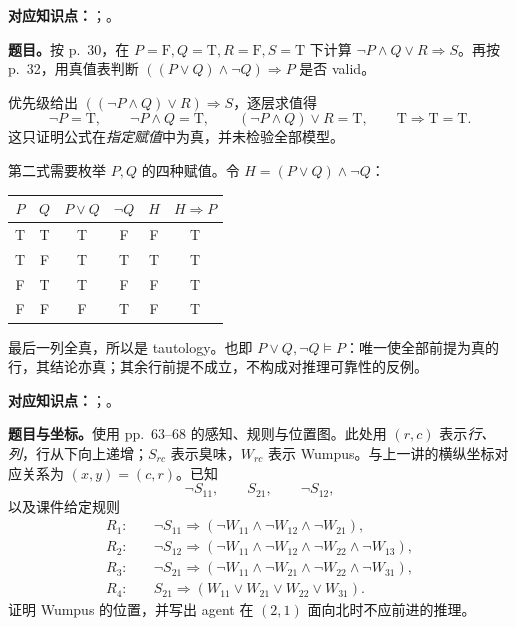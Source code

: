 
\textbf{对应知识点：}；。

\textbf{题目。}按 p.~30，在 $P=\mathrm F,Q=\mathrm T,R=\mathrm F,S=\mathrm T$ 下计算 $\neg P\land Q\lor R\Rightarrow S$。再按 p.~32，用真值表判断 $((P\lor Q)\land\neg Q)\Rightarrow P$ 是否 valid。

\begin{workedsolution}
优先级给出 $((\neg P\land Q)\lor R)\Rightarrow S$，逐层求值得
\[
 \neg P=\mathrm T,\qquad
 \neg P\land Q=\mathrm T,\qquad
 (\neg P\land Q)\lor R=\mathrm T,\qquad
 \mathrm T\Rightarrow\mathrm T=\boxed{\mathrm T}.
\]
这只证明公式在\emph{指定赋值}中为真，并未检验全部模型。

第二式需要枚举 $P,Q$ 的四种赋值。令 $H=(P\lor Q)\land\neg Q$：
\begin{center}
\begin{tabular}{@{}cc|cccc@{}}
\toprule
$P$ & $Q$ & $P\lor Q$ & $\neg Q$ & $H$ & $H\Rightarrow P$ \\
\midrule
T & T & T & F & F & T \\
T & F & T & T & T & T \\
F & T & T & F & F & T \\
F & F & F & T & F & T \\
\bottomrule
\end{tabular}
\end{center}
最后一列全真，所以是 tautology。也即 $P\lor Q,\neg Q\models P$：唯一使全部前提为真的行，其结论亦真；其余行前提不成立，不构成对推理可靠性的反例。
\end{workedsolution}


\textbf{对应知识点：}；。

\textbf{题目与坐标。}使用 pp.~63--68 的感知、规则与位置图。此处用 $(r,c)$ 表示\emph{行、列}，行从下向上递增；$S_{rc}$ 表示臭味，$W_{rc}$ 表示 Wumpus。与上一讲的横纵坐标对应关系为 $(x,y)=(c,r)$。已知
\[
 \neg S_{11},\qquad S_{21},\qquad\neg S_{12},
\]
以及课件给定规则
\begin{align*}
 R_1:\quad&\neg S_{11}\Rightarrow
  (\neg W_{11}\land\neg W_{12}\land\neg W_{21}),\\
 R_2:\quad&\neg S_{12}\Rightarrow
  (\neg W_{11}\land\neg W_{12}\land\neg W_{22}\land\neg W_{13}),\\
 R_3:\quad&\neg S_{21}\Rightarrow
  (\neg W_{11}\land\neg W_{21}\land\neg W_{22}\land\neg W_{31}),\\
 R_4:\quad&S_{21}\Rightarrow
  (W_{11}\lor W_{21}\lor W_{22}\lor W_{31}).
\end{align*}
证明 Wumpus 的位置，并写出 agent 在 $(2,1)$ 面向北时不应前进的推理。


